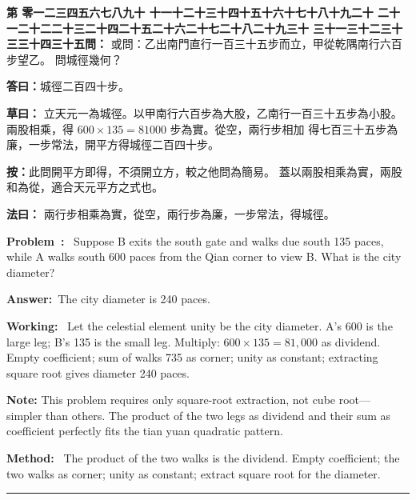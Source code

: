 \documentclass[9pt,a4paper]{article}
\newcounter{probnum}
\newcounter{overallnum}
\newcommand{\chnum}[1]{%
  \ifcase#1 零\or 一\or 二\or 三\or 四\or 五\or 六\or 七\or 八\or 九\or 十\or
    十一\or 十二\or 十三\or 十四\or 十五\or 十六\or 十七\or 十八\or 十九\or 二十\or
    二十一\or 二十二\or 二十三\or 二十四\or 二十五\or 二十六\or 二十七\or 二十八\or 二十九\or 三十\or
    三十一\or 三十二\or 三十三\or 三十四\or 三十五\fi}
\newcommand{\problem}[1]{\stepcounter{probnum}\stepcounter{overallnum}\par\noindent\textbf{\color{volcolor}第\chnum{\value{probnum}}問：}#1\par\vspace{0.15cm}}
\newcommand{\answer}[1]{\par\noindent\textbf{答曰：}#1\par\vspace{0.15cm}}
\newcommand{\working}[1]{\par\noindent\textbf{草曰：}#1\par\vspace{0.15cm}}
\newcommand{\method}[1]{\par\noindent\textbf{法曰：}#1\par\vspace{0.25cm}}
\newcommand{\eproblem}[1]{\par\noindent\textbf{\color{volcolor}Problem~\theoverallnum:}~#1\par\vspace{0.15cm}}
\newcommand{\eanswer}[1]{\par\noindent\textbf{Answer:}~#1\par\vspace{0.15cm}}
\newcommand{\eworking}[1]{\par\noindent\textbf{Working:}~#1\par\vspace{0.15cm}}
\newcommand{\emethod}[1]{\par\noindent\textbf{Method:}~#1\par\vspace{0.25cm}}
\begin{document}
\noindent\begin{minipage}[t]{0.48\textwidth}
\problem{
或問：乙出南門直行一百三十五步而立，甲從乾隅南行六百步望乙。
問城徑幾何？
}

\answer{城徑二百四十步。}

\working{
立天元一為城徑。以甲南行六百步為大股，乙南行一百三十五步為小股。
兩股相乘，得 $600 \times 135 = 81000$ 步為實。從空，兩行步相加
得七百三十五步為廉，一步常法，開平方得城徑二百四十步。

\textbf{按：}此問開平方即得，不須開立方，較之他問為簡易。
蓋以兩股相乘為實，兩股和為從，適合天元平方之式也。
}

\method{
兩行步相乘為實，從空，兩行步為廉，一步常法，得城徑。
}
\end{minipage}%
\hfill%
\begin{minipage}[t]{0.50\textwidth}
\eproblem{
Suppose B exits the south gate and walks due south 135 paces, while A walks
south 600 paces from the Qian corner to view B. What is the city diameter?
}

\eanswer{The city diameter is 240 paces.}

\eworking{
Let the celestial element unity be the city diameter. A's 600 is the large
leg; B's 135 is the small leg. Multiply: $600 \times 135 = 81{,}000$ as dividend.
Empty coefficient; sum of walks 735 as corner; unity as constant;
extracting square root gives diameter 240 paces.

\textbf{Note:} This problem requires only square-root extraction, not cube root---
simpler than others. The product of the two legs as dividend and their sum as
coefficient perfectly fits the tian yuan quadratic pattern.
}

\emethod{
The product of the two walks is the dividend. Empty coefficient; the two
walks as corner; unity as constant; extract square root for the diameter.
}
\end{minipage}
\vspace{0.15cm}

\vspace{0.15cm}
\noindent\rule{\textwidth}{0.2pt}
\vspace{0.15cm}
\end{document}
